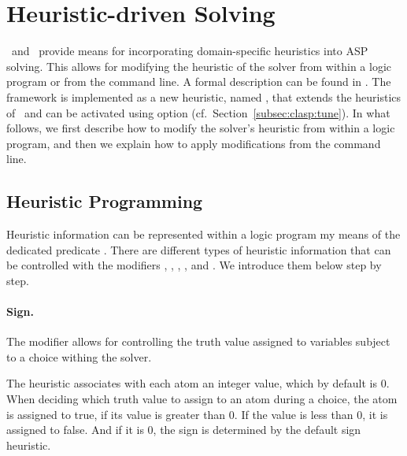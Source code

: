 
\section{Heuristic-driven Solving}
\label{sec:heuristic}

\clasp\ and \clingo\ provide means for incorporating domain-specific heuristics into ASP solving.
This allows for modifying the heuristic of the solver from within a logic program or from the command line.
A formal description can be found in \cite{gekaotroscwa13a}.
The framework is implemented as a new heuristic, named ,
that extends the  heuristics of \clasp\ 
and can be activated using option 
(cf.\ Section~\ref{subsec:clasp:tune}).
In what follows,
we first describe how to modify the solver's heuristic from within a logic program, 
and then we explain how to apply modifications from the command line.

\subsection{Heuristic Programming}

Heuristic information can be represented within a logic program my means of the dedicated predicate .
There are different types of heuristic information
that can be controlled with the modifiers 
, , , ,  and .
We introduce them below step by step.

\paragraph{Sign.}

The modifier  allows for controlling the truth value assigned to variables subject to a choice withing the solver.

The  heuristic associates with each atom an integer  value, which by default is $0$.
When deciding which truth value to assign to an atom during a choice, the atom is assigned to true, if its  value is greater than $0$. 
If the \code{sign} value is less than 0, it is assigned to false.
And if it is $0$, the sign is determined by the default sign heuristic.

